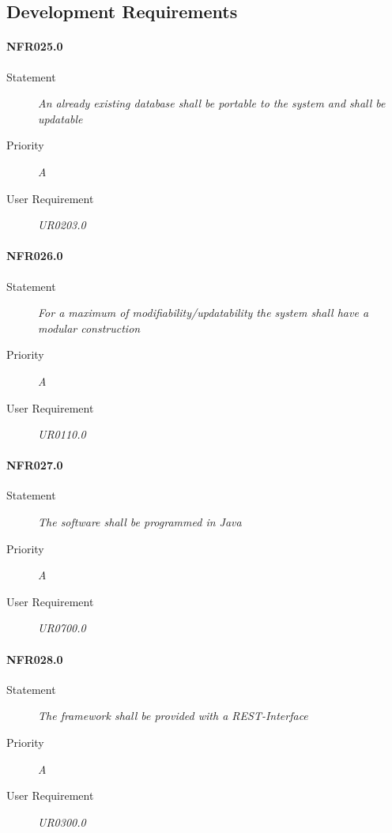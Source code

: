 \subsection{Development Requirements}

\paragraph{NFR025.0}
\begin{description}
\item [Statement] \textit{
An already existing database shall be portable to the system and shall be updatable
}
\item [Priority] \textit{A}
\item[User Requirement] \textit{UR0203.0}
\end{description}

\paragraph{NFR026.0}
\begin{description}
\item [Statement] \textit{
For a maximum of modifiability/updatability the system shall have a modular construction
}
\item [Priority] \textit{A}
\item[User Requirement] \textit{UR0110.0}
\end{description}

\paragraph{NFR027.0}
\begin{description}
\item [Statement] \textit{
The software shall be programmed in \gls{Java}
}
\item [Priority] \textit{A}
\item[User Requirement] \textit{UR0700.0}
\end{description}

\paragraph{NFR028.0}
\begin{description}
\item [Statement] \textit{
The framework shall be provided with a \gls{REST}-Interface
}
\item [Priority] \textit{A}
\item[User Requirement] \textit{UR0300.0}
\end{description}